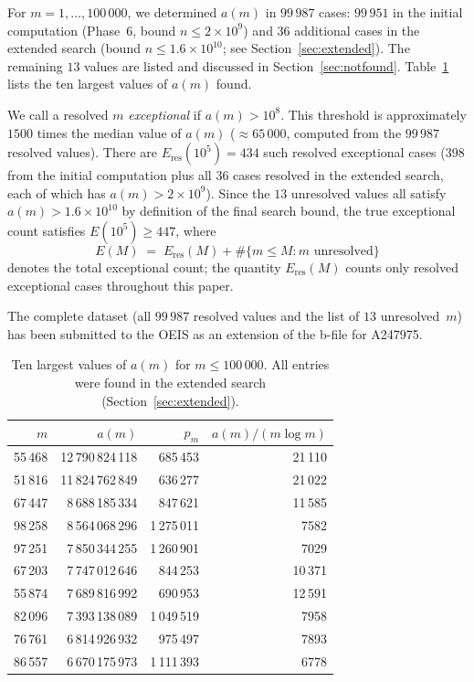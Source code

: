 \documentclass[12pt]{article}
\begin{document}
	For $m = 1, \ldots, 100\,000$, we determined $a(m)$ in $99\,987$ cases:
	$99\,951$ in the initial computation (Phase~6, bound
	$n \leq 2 \times 10^9$) and $36$ additional cases in the extended
	search (bound $n \leq 1.6 \times 10^{10}$; see
	Section~\ref{sec:extended}).
	The remaining $13$ values are listed and discussed in
	Section~\ref{sec:notfound}.
	Table~\ref{tab:top10} lists the ten largest values of $a(m)$ found.
	
	We call a resolved $m$ \emph{exceptional} if $a(m) > 10^8$.
	This threshold is approximately $1500$ times the median value of $a(m)$
	($\approx 65\,000$, computed from the $99\,987$ resolved values).
	There are $E_{\mathrm{res}}(10^5) = 434$ such resolved exceptional
	cases ($398$ from the initial computation plus all $36$ cases resolved
	in the extended search, each of which has $a(m) > 2 \times 10^9$).
	Since the $13$ unresolved values all satisfy
	$a(m) > 1.6 \times 10^{10}$ by definition of the final search bound,
	the true exceptional count satisfies $E(10^5) \geq 447$, where
	\[
	E(M) \;=\; E_{\mathrm{res}}(M)
	+ \#\bigl\{m \leq M : m \text{ unresolved}\bigr\}
	\]
	denotes the total exceptional count; the quantity $E_{\mathrm{res}}(M)$
	counts only resolved exceptional cases throughout this paper.
	
	The complete dataset (all $99\,987$ resolved values and the list of
	$13$ unresolved~$m$) has been submitted to the OEIS as an extension of
	the b-file for A247975.
	
	\begin{table}[ht]
		\centering
		\caption{Ten largest values of $a(m)$ for $m \leq 100\,000$.
			All entries were found in the extended search
			(Section~\ref{sec:extended}).}
		\label{tab:top10}
		\begin{tabular}{rrrr}
			\toprule
			$m$ & $a(m)$ & $p_m$ & $a(m)/(m \log m)$ \\
			\midrule
			55\,468 & 12\,790\,824\,118 &  685\,453 & 21\,110 \\
			51\,816 & 11\,824\,762\,849 &  636\,277 & 21\,022 \\
			67\,447 &  8\,688\,185\,334 &  847\,621 & 11\,585 \\
			98\,258 &  8\,564\,068\,296 & 1\,275\,011 &  7582 \\
			97\,251 &  7\,850\,344\,255 & 1\,260\,901 &  7029 \\
			67\,203 &  7\,747\,012\,646 &  844\,253 & 10\,371 \\
			55\,874 &  7\,689\,816\,992 &  690\,953 & 12\,591 \\
			82\,096 &  7\,393\,138\,089 & 1\,049\,519 &  7958 \\
			76\,761 &  6\,814\,926\,932 &  975\,497 &  7893 \\
			86\,557 &  6\,670\,175\,973 & 1\,111\,393 &  6778 \\
			\bottomrule
		\end{tabular}
	\end{table}
	
\end{document}
